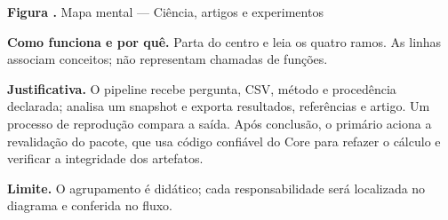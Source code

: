 {\small\textbf{Figura \thefigure.} Mapa mental --- Ciência, artigos e experimentos}\par\smallskip
\noindent\textbf{Como funciona e por quê.} Parta do centro e leia os quatro ramos. As linhas associam conceitos; não representam chamadas de funções.\par
\noindent\textbf{Justificativa.} O pipeline recebe pergunta, CSV, método e procedência declarada; analisa um snapshot e exporta resultados, referências e artigo. Um processo de reprodução compara a saída. Após conclusão, o primário aciona a revalidação do pacote, que usa código confiável do Core para refazer o cálculo e verificar a integridade dos artefatos.\par
\noindent\textbf{Limite.} O agrupamento é didático; cada responsabilidade será localizada no diagrama e conferida no fluxo.\par\smallskip
{}
